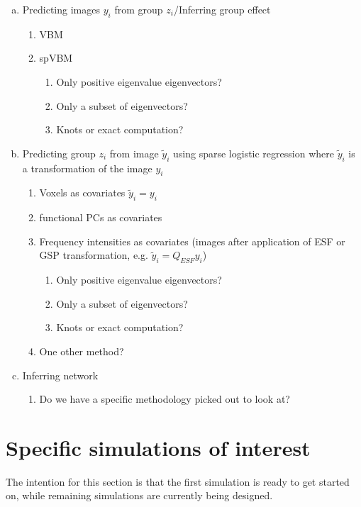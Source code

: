 \documentclass[12pt]{article}
\begin{document}
\begin{enumerate}[(a)]
	\item Predicting images $y_i$ from group $z_i$/Inferring group effect
		\begin{enumerate}[(1)]
			\item VBM
			\item spVBM
			\begin{enumerate}
				\item Only positive eigenvalue eigenvectors?
				\item Only a subset of eigenvectors?
				\item Knots or exact computation?
			\end{enumerate}
		\end{enumerate}
	\item Predicting group $z_i$ from image $\tilde y_i$ using sparse logistic regression where $\tilde y_i$ is a transformation of the image $y_i$
	\begin{enumerate}[(1)]
		\item Voxels as covariates $\tilde y_i=y_i$
		\item functional PCs as covariates
		\item Frequency intensities as covariates (images after application of ESF or GSP transformation, e.g. $\tilde y_i=Q_{ESF}y_i$)
			\begin{enumerate}
				\item Only positive eigenvalue eigenvectors?
				\item Only a subset of eigenvectors?
				\item Knots or exact computation?
			\end{enumerate}
		\item One other method?
	\end{enumerate}
	\item Inferring network
		\begin{enumerate}
			\item Do we have a specific methodology picked out to look at?
		\end{enumerate}
\end{enumerate}



\section*{Specific simulations of interest}

The intention for this section is that the first simulation is ready to get started on, while remaining simulations are currently being designed.
\end{document}
